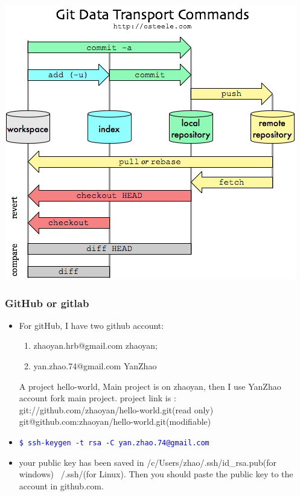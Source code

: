 \documentclass[a4paper,12pt,twoside]{book}
\newcommand{\linuxcommand}[1]{\texttt{\textcolor{blue}{\$ #1 \Pisymbol{psy}{191}}}}
\begin{document}
\begin{itemize}
\begin{itemize}
\includegraphics[scale=0.7]{pics/git-transport} \\

   \end{itemize}

\subsubsection{GitHub or gitlab}
\begin{itemize}
\item For gitHub, I have two github account:
\begin{enumerate}
  \item zhaoyan.hrb@gmail.com  zhaoyan;
  \item yan.zhao.74@gmail.com YanZhao
\end{enumerate}
A project hello-world, Main project is on zhaoyan, then I use YanZhao account fork main project. project link is : \\
git://github.com/zhaoyan/hello-world.git(read only) \\
git@github.com:zhaoyan/hello-world.git(modifiable)


\item \linuxcommand{ssh-keygen -t rsa -C yan.zhao.74@gmail.com} \\
    \item your public key has been saved in /c/Users/zhao/.ssh/id\_rsa.pub(for windows) ~/.ssh/(for Linux). Then you should paste the public key to the account in github.com.  
        	

\end{itemize}
\end{itemize}
\end{document}
